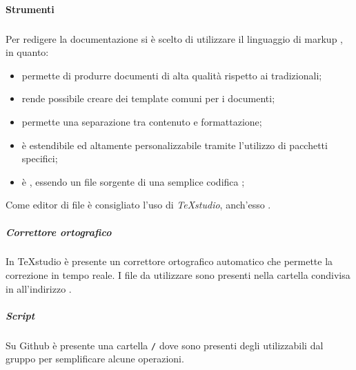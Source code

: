 \paragraph{Strumenti}
	\subparagraph{\gl{\LaTeX}}
	Per redigere la documentazione si è scelto di utilizzare il linguaggio di markup \gl{\LaTeX}, in quanto: \\
	\begin{itemize} 
		\item permette di produrre documenti di alta qualità rispetto ai  tradizionali; 
		\item rende possibile creare dei template comuni per i documenti;
		\item permette una separazione tra contenuto e formattazione;
		\item è estendibile ed altamente personalizzabile tramite l'utilizzo di pacchetti specifici;
		\item è , essendo un file sorgente di \gl{\LaTeX} una semplice codifica ;
		\end{itemize}
		Come editor di file  è consigliato l'uso di \textit{TeXstudio}, anch'esso .	
	\subparagraph{Correttore ortografico}
	In TeXstudio è presente un correttore ortografico automatico che permette la correzione in tempo reale. I file da utilizzare sono presenti nella cartella condivisa in  all'indirizzo .
	\subparagraph{Script}
		Su Github è presente una cartella \texttt{/} dove sono presenti degli  utilizzabili dal gruppo per semplificare alcune operazioni.